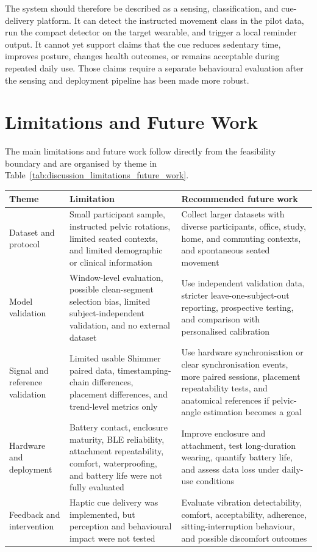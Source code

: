 The system should therefore be described as a sensing, classification, and cue-delivery platform. It can detect the instructed movement class in the pilot data, run the compact detector on the target wearable, and trigger a local reminder output. It cannot yet support claims that the cue reduces sedentary time, improves posture, changes health outcomes, or remains acceptable during repeated daily use. Those claims require a separate behavioural evaluation after the sensing and deployment pipeline has been made more robust.

\clearpage
\section{Limitations and Future Work}

The main limitations and future work follow directly from the feasibility boundary and are organised by theme in Table~\ref{tab:discussion_limitations_future_work}.

\begin{strip}
    \centering
    \scriptsize
    \captionsetup{skip=2pt}
    \label{tab:discussion_limitations_future_work}
    \begin{tabularx}{\textwidth}{@{}p{}p{}X@{}}
        \toprule
        Theme & Limitation & Recommended future work \\
        \midrule
        Dataset and protocol & Small participant sample, instructed pelvic rotations, limited seated contexts, and limited demographic or clinical information & Collect larger datasets with diverse participants, office, study, home, and commuting contexts, and spontaneous seated movement \\
        Model validation & Window-level evaluation, possible clean-segment selection bias, limited subject-independent validation, and no external dataset & Use independent validation data, stricter leave-one-subject-out reporting, prospective testing, and comparison with personalised calibration \\
        Signal and reference validation & Limited usable Shimmer paired data, timestamping-chain differences, placement differences, and trend-level metrics only & Use hardware synchronisation or clear synchronisation events, more paired sessions, placement repeatability tests, and anatomical references if pelvic-angle estimation becomes a goal \\
        Hardware and deployment & Battery contact, enclosure maturity, BLE reliability, attachment repeatability, comfort, waterproofing, and battery life were not fully evaluated & Improve enclosure and attachment, test long-duration wearing, quantify battery life, and assess data loss under daily-use conditions \\
        Feedback and intervention & Haptic cue delivery was implemented, but perception and behavioural impact were not tested & Evaluate vibration detectability, comfort, acceptability, adherence, sitting-interruption behaviour, and possible discomfort outcomes \\
        \bottomrule
    \end{tabularx}
\end{strip}
